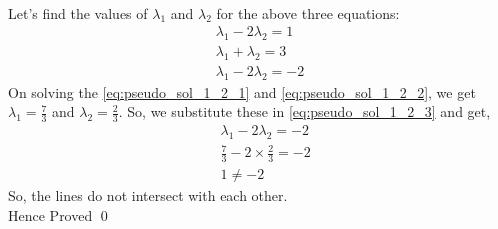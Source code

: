 \documentclass[journal,12pt,twocolumn]{IEEEtran}
\renewcommand\thesection{\arabic{section}}
\begin{document}
\begin{enumerate}[label=\thesection.\arabic*.,ref=\thesection.\theenumi]
\begin{align*}
\end{align*}
Let's find the values of $\lambda_1$ and $\lambda_2$ for the above three equations:
\begin{align}
\lambda_1-2\lambda_2=1\label{eq:pseudo_sol_1_2_1}\\
\lambda_1+\lambda_2=3 \label{eq:pseudo_sol_1_2_2}\\
\lambda_1-2\lambda_2=-2\label{eq:pseudo_sol_1_2_3}
\end{align}
On solving the \eqref{eq:pseudo_sol_1_2_1} and \eqref{eq:pseudo_sol_1_2_2}, we get $\lambda_1=\frac{7}{3}$ and $\lambda_2=\frac{2}{3}$. So, we substitute these in \eqref{eq:pseudo_sol_1_2_3} and get,
\begin{align*}
& \lambda_1-2\lambda_2=-2\\
& \frac{7}{3}-2\times\frac{2}{3}=-2\\
& 1\neq-2
\end{align*}
So, the lines do  not intersect with each other.\\
Hence Proved \qed


\end{enumerate}
\end{document}
